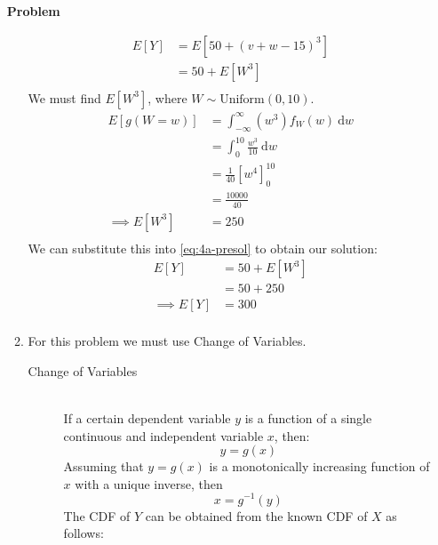 \documentclass[12pt]{article}
\newenvironment{Ex}{\textbf{Problem}\vspace{.75em}\\}{}
\newcommand{\dd}[1]{\:\mathrm{d}{#1}}
\begin{document}
\begin{enumerate}
\begin{Ex}
\begin{solution}
\begin{enumerate}
\begin{equation}
          \begin{aligned}
            E[Y] &= E[50 + (v+w-15)^3] \\
            &= 50 + E[W^3] \\
          \end{aligned}
        \end{equation}
        We must find $E[W^3]$, where $W\sim\text{Uniform}(0,10)$.
        \begin{equation}
          \label{eq:4a-w-cubed}
          \begin{aligned}
            E[g(W=w)] &= \int_{-\infty}^{\infty} (w^3)f_W(w) \dd{w} \\
            &= \int_{0}^{10}\frac{w^3}{10} \dd{w} \\
            &= \frac{1}{40} [w^4]_{0}^{10} \\
            &= \frac{10000}{40} \\
            \implies E[W^3] &= 250 \\
          \end{aligned}
        \end{equation}
        We can substitute this into \cref{eq:4a-presol} to obtain our
        solution:
        \begin{equation}
          \label{eq:4a-sol}
          \begin{aligned}
            E[Y] &= 50 + E[W^3] \\
            &= 50 + 250 \\
            \implies E[Y] &= 300 \\
          \end{aligned}
        \end{equation}
      \item For this problem we must use Change of Variables.
        \begin{mdframed}[backgroundcolor=silver]
          \begin{description}
          \item[Change of Variables] \hfill \vspace{.75em} \\
            If a certain dependent variable $y$ is a function of a
            single continuous and independent variable $x$, then:
            $$y = g(x)$$
            Assuming that $y=g(x)$ is a monotonically increasing
            function of $x$ with a unique inverse, then
            $$x=g^{-1}(y)$$
            The CDF of $Y$ can be obtained from the known CDF of $X$ as
            follows:
            \begin{equation*}

\end{equation*}
\end{description}
\end{mdframed}
\end{enumerate}
\end{solution}
\end{Ex}
\end{enumerate}
\end{document}
